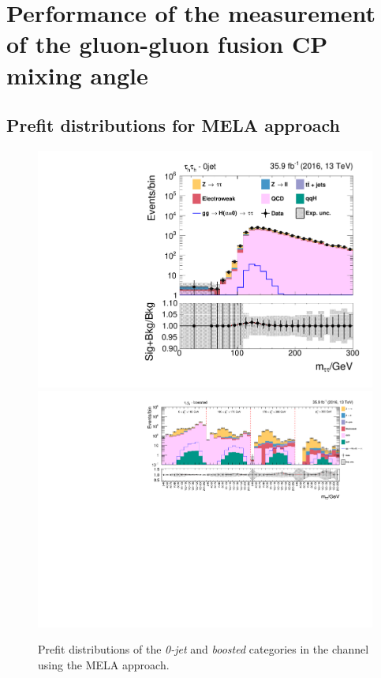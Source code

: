%
\section{Performance of the measurement of the gluon-gluon fusion CP mixing angle}

\subsection{Prefit distributions for MELA approach}\label{prefit_mela_supp}

\begin{figure}[h!]
    \centering
        \includegraphics[width=.5\textwidth]{Figures/statana/Postfit_JEC_mela3D/prefit_htt_tt_1_13TeV.pdf}\\
        \includegraphics[width=\textwidth]{Figures/statana/Postfit_JEC_mela3D/prefit_htt_tt_2_13TeV.pdf}
        \caption{Prefit distributions of the \textit{0-jet} and \textit{boosted} categories in the \tautau{} channel using the MELA approach.}
    \end{figure}
